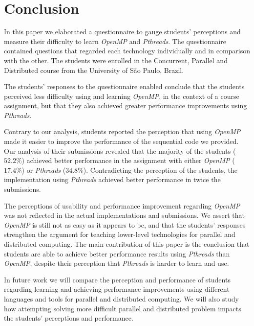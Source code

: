 \section{Conclusion}
\label{sec:conclusion}

In this paper we elaborated a questionnaire to gauge students' perceptions and
measure their difficulty to learn \textit{OpenMP} and \textit{Pthreads}.  The
questionnaire contained questions that regarded each technology individually
and in comparison with the other.  The students were enrolled in the
Concurrent, Parallel and Distributed course from the University of São Paulo,
Brazil.

The students' responses to the questionnaire enabled conclude that the students
perceived less difficulty using and learning \textit{OpenMP}, in the context of
a course assignment, but that they also achieved greater performance
improvements using \textit{Pthreads}.

Contrary to our analysis, students reported the perception that using
\textit{OpenMP} made it easier to improve the performance of the sequential
code we provided.  Our analysis of their submissions revealed that the majority
of the students ($52.2\%$) achieved better performance in the assignment with
either \textit{OpenMP} ($17.4\%$) or \textit{Pthreads} ($34.8\%$).
Contradicting the perception of the students, the implementation using
\textit{Pthreads} achieved better performance in twice the submissions.

The perceptions of usability and performance improvement regarding
\textit{OpenMP} was not reflected in the actual implementations and
submissions.  We assert that \textit{OpenMP} is still not as easy as it appears
to be, and that the students' responses strengthen the argument for teaching
lower-level technologies for parallel and distributed computing.
The main contribution of this paper is the conclusion that students
are able to achieve better performance results using \textit{Pthreads}
than \textit{OpenMP}, despite their perception that \textit{Pthreads}
is harder to learn and use.

In future work we will compare the perception and performance of students
regarding learning and achieving performance improvements using different
languages and tools for parallel and distributed computing. We will also study
how attempting solving more difficult parallel and distributed problem impacts
the students' perceptions and performance.

